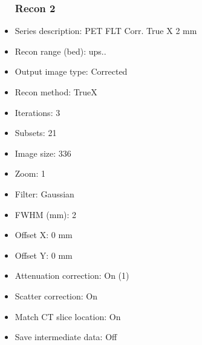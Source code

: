 \documentclass[12pt]{article}
\begin{document}
\begin{itemize}
\subsubsection{Recon 2}
\item Series description: PET FLT Corr. True X 2 mm
\item Recon range (bed): ups..
\item Output image type: Corrected
\item Recon method: TrueX
\item Iterations: 3
\item Subsets: 21
\item Image size: 336
\item Zoom: 1
\item Filter: Gaussian
\item FWHM (mm): 2
\item Offset X: 0 mm
\item Offset Y: 0 mm
\item Attenuation correction: On (1)
\item Scatter correction: On
\item Match CT slice location: On
\item Save intermediate data: Off
\end{itemize}
\end{document}

